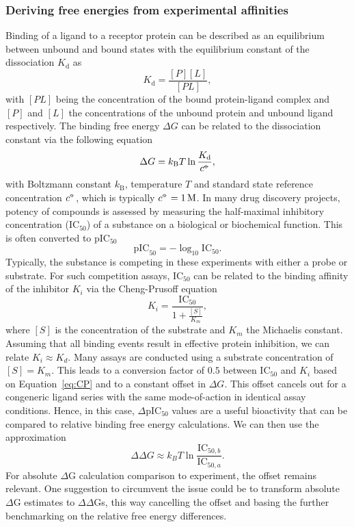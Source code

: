 \documentclass[9pt,bestpractices,pubversion]{livecoms}
\newcommand\standardstate{{\circ\kern-0.495em-}}
\begin{document}
\subsubsection{Deriving free energies from experimental affinities}
Binding of a ligand to a receptor protein can be described as an equilibrium between unbound and bound states with the equilibrium constant of the dissociation $K_\mathrm{d}$ as
\begin{equation*}
    K_\mathrm{d} = \frac{[P][L]}{[PL]},
\end{equation*}
with $[PL]$ being the concentration of the bound protein-ligand complex and $[P]$ and $[L]$ the concentrations of the unbound protein and unbound ligand respectively. The binding free energy $\Delta G$ can be related to the dissociation constant via the following equation
\begin{equation}
    \label{eq:kdtodg}
    \Delta G = k_\mathrm{B} T \ln \frac{K_\mathrm{d}}{c^{\standardstate}},
\end{equation}
with Boltzmann constant $k_\mathrm{B}$, temperature $T$ and standard state reference concentration $c^{\standardstate}$, which is typically $c^{\standardstate}=1\,\mathrm{M}$. 
In many drug discovery projects, potency of compounds is assessed by measuring the half-maximal inhibitory concentration (IC$_{50}$) of a substance on a biological or biochemical function. This is often converted to pIC$_{50}$
\begin{equation*}
    \label{eq:pic50}
    \mathrm{pIC}_{50} = - \log_{10} \mathrm{IC}_{50}.
\end{equation*}
Typically, the substance is competing in these experiments with either a probe or substrate. For such competition assays, IC$_{50}$ can be related to the binding affinity of the inhibitor $K_i$ via the Cheng-Prusoff equation
\begin{equation}
\label{eq:CP}
    K_i = \frac{\mathrm{IC}_{50}}{1+\tfrac{[S]}{K_m}},
\end{equation}
where $[S]$ is the concentration of the substrate and $K_m$ the Michaelis constant. 
Assuming that all binding events result in effective protein inhibition, we can relate $K_i \approx K_d$.
Many assays are conducted using a substrate concentration of $[S] = K_m$. This leads to a conversion factor of $0.5$ between IC$_{50}$ and $K_i$ based on Equation~\ref{eq:CP} and to a constant offset in $\Delta G$. This offset cancels out for a congeneric ligand series with the same mode-of-action in identical assay conditions. Hence, in this case, $\Delta $pIC$_{50}$ values are a useful bioactivity that can be compared to relative binding free energy calculations. We can then use the approximation
\begin{equation*}
    \label{eq:ic50todg}
    \Delta\Delta G \approx k_B T \ln \frac{\mathrm{IC}_{50,b}}{\mathrm{IC}_{50,a}}.
\end{equation*}
%
For absolute $\Delta$G calculation comparison to experiment, the offset remains relevant. One suggestion to circumvent the issue could be to transform absolute $\Delta$G estimates to $\Delta\Delta$Gs, this way cancelling the offset and basing the further benchmarking on the relative free energy differences.
\end{document}
